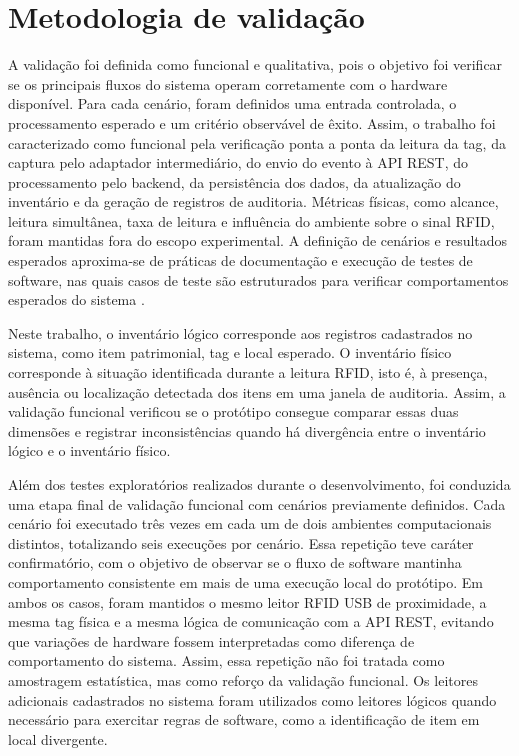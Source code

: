 \section{Metodologia de validação}

A validação foi definida como funcional e qualitativa, pois o objetivo foi verificar se os principais fluxos do sistema operam corretamente com o hardware disponível. Para cada cenário, foram definidos uma entrada controlada, o processamento esperado e um critério observável de êxito. Assim, o trabalho foi caracterizado como funcional pela verificação ponta a ponta da leitura da tag, da captura pelo adaptador intermediário, do envio do evento à API REST, do processamento pelo backend, da persistência dos dados, da atualização do inventário e da geração de registros de auditoria. Métricas físicas, como alcance, leitura simultânea, taxa de leitura e influência do ambiente sobre o sinal RFID, foram mantidas fora do escopo experimental. A definição de cenários e resultados esperados aproxima-se de práticas de documentação e execução de testes de software, nas quais casos de teste são estruturados para verificar comportamentos esperados do sistema \cite{iso29119}.

Neste trabalho, o inventário lógico corresponde aos registros cadastrados no sistema, como item patrimonial, tag e local esperado. O inventário físico corresponde à situação identificada durante a leitura RFID, isto é, à presença, ausência ou localização detectada dos itens em uma janela de auditoria. Assim, a validação funcional verificou se o protótipo consegue comparar essas duas dimensões e registrar inconsistências quando há divergência entre o inventário lógico e o inventário físico.

Além dos testes exploratórios realizados durante o desenvolvimento, foi conduzida uma etapa final de validação funcional com cenários previamente definidos. Cada cenário foi executado três vezes em cada um de dois ambientes computacionais distintos, totalizando seis execuções por cenário. Essa repetição teve caráter confirmatório, com o objetivo de observar se o fluxo de software mantinha comportamento consistente em mais de uma execução local do protótipo. Em ambos os casos, foram mantidos o mesmo leitor RFID USB de proximidade, a mesma tag física e a mesma lógica de comunicação com a API REST, evitando que variações de hardware fossem interpretadas como diferença de comportamento do sistema. Assim, essa repetição não foi tratada como amostragem estatística, mas como reforço da validação funcional. Os leitores adicionais cadastrados no sistema foram utilizados como leitores lógicos quando necessário para exercitar regras de software, como a identificação de item em local divergente.

